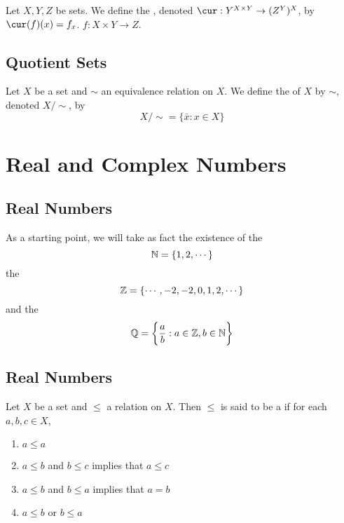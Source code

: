 \documentclass{book}
\begin{document}
	
	\begin{defn}
		Let $X, Y, Z$ be sets. We define the , denoted $\cur: Y^{X \times Y} \rightarrow (Z^Y)^X$, by 
		$\cur(f)(x) = f_x$.  $f: X \times Y \rightarrow Z$.
	\end{defn}
	
	
	
	
	
	
	
	
	
	
	
	
	
	
	
	
	
	\newpage
	\section{Quotient Sets}
	\begin{defn}
	Let $X$ be a set and $\sim$ an equivalence relation on $X$. We define the  of $X$ by $\sim$, denoted $X/ {\sim}$, by 
	\begin{equation*}
	X/ {\sim} = \{\bar{x}: x \in X\}
	\end{equation*}
	\end{defn}
	
	
	\chapter{Real and Complex Numbers}
	
	\section{Real Numbers}
	\begin{note}
		As a starting point, we will take as fact the existence of the  $$\mathbb{N} = \{1, 2, \cdots\}$$ the  $$\mathbb{Z} = \{\cdots, -2, -2, 0, 1, 2, \cdots\}$$ and the  $$\mathbb{Q} = \bigg \{\frac{a}{b}: a \in \mathbb{Z}, b \in \mathbb{N} \bigg \}$$
	\end{note}
	\section{Real Numbers}
	
	\begin{defn} \ld{}
		Let $X$ be a set and $\leq$ a relation on $X$. Then $\leq$ is said to be a  if for each $a,b,c \in X$,
		\begin{enumerate}
			\item $a \leq a$
			\item $a \leq b$ and $b \leq c$ implies that $a \leq  c$ 
			\item $a \leq b$ and $b \leq a$ implies that $a = b$ 
			\item $a \leq b$ or $b \leq a$
		\end{enumerate}
	\end{defn}
\end{document}
